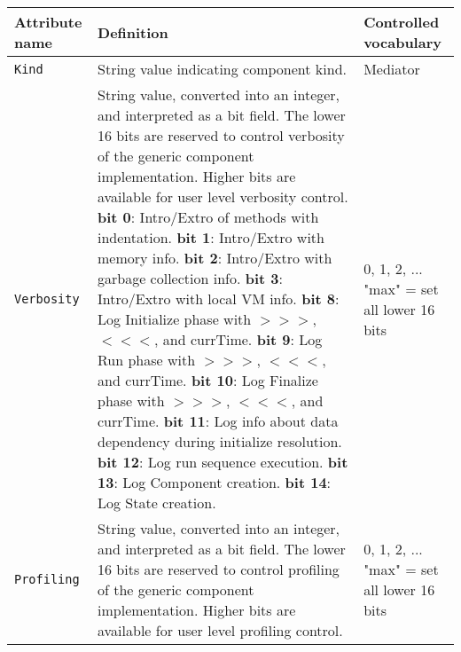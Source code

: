 \begin{longtable}{|p{}|p{}|p{}|}
     \hline\hline
     {\bf Attribute name} & {\bf Definition} & {\bf Controlled vocabulary}\\
     \hline\hline
     {\tt Kind} & String value indicating component kind.& Mediator\\ \hline
     {\tt Verbosity} & String value, converted into an integer, and interpreted as a bit field. The lower 16 bits are reserved to control verbosity of the generic component implementation. Higher bits are available for user level verbosity control. \newline
                       {\bf bit 0}: Intro/Extro of methods with indentation.\newline
                       {\bf bit 1}: Intro/Extro with memory info.\newline
                       {\bf bit 2}: Intro/Extro with garbage collection info.\newline
                       {\bf bit 3}: Intro/Extro with local VM info.\newline
                       {\bf bit 8}: Log Initialize phase with $>>>$, $<<<$, and currTime.\newline
                       {\bf bit 9}: Log Run phase with $>>>$, $<<<$, and currTime.\newline
                       {\bf bit 10}: Log Finalize phase with $>>>$, $<<<$, and currTime.\newline
                       {\bf bit 11}: Log info about data dependency during initialize resolution.\newline
                       {\bf bit 12}: Log run sequence execution.\newline
                       {\bf bit 13}: Log Component creation.\newline
                       {\bf bit 14}: Log State creation.
                     & 0, 1, 2, ... \newline
                       "max" = set all lower 16 bits\\ \hline
     {\tt Profiling} & String value, converted into an integer, and interpreted as a bit field. The lower 16 bits are reserved to control profiling of the generic component implementation. Higher bits are available for user level profiling control.
                     & 0, 1, 2, ... \newline
                       "max" = set all lower 16 bits\\ \hline

\end{longtable}
